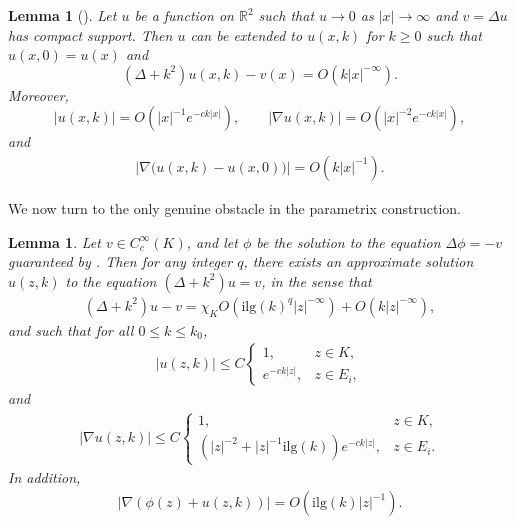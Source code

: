 \documentclass[12pt]{amsart}
\newtheorem{lemma}[theorem]{Lemma}
\begin{document}
\begin{lemma}[{\cite[Lemma~2.12]{HNS}}]\label{lemma_HNS_2.12}
Let $u$ be a function on $\mathbb{R}^2$ such that $u \to 0$ as $|x| \to \infty$ and $v = \Delta u$ has compact support. Then $u$ can be extended to $u(x,k)$ for $k \ge 0$ such that $u(x,0)=u(x)$ and 
\[
(\Delta+k^2)u(x,k) - v(x) = O(k |x|^{-\infty}).
\]
Moreover,
\[
|u(x,k)| = O(|x|^{-1} e^{-ck|x|}), 
\qquad 
|\nabla u(x,k)| = O(|x|^{-2} e^{-ck|x|}),
\]
and
\begin{align}\label{deri4}
|\nabla \big(u(x,k) - u(x,0)\big)| = O(k|x|^{-1}).
\end{align}
\end{lemma}

We now turn to the only genuine obstacle in the parametrix construction.

\begin{lemma}\label{keylemma_proof}
Let $v\in C_c^\infty(K)$, and let $\phi$ be the solution to the equation $\Delta \phi = -v$ guaranteed by \cite[Lemma~2.9]{HNS}. Then for any integer $q$, there exists an approximate solution $u(z,k)$ to the equation $(\Delta+k^2)u = v$, in the sense that
\begin{align}\label{eq_error_est}
    (\Delta+k^2)u - v = \chi_K  O(\textrm{ilg}(k)^q |z|^{-\infty}) + O(k |z|^{-\infty}),
\end{align}
and such that for all $0\le k \le k_0$,
\begin{align}\label{eq_u}
    |u(z,k)| \le C \begin{cases}
        1, &z\in K,\\
        e^{-ck|z|}, &z\in E_i,
    \end{cases}
\end{align}
and
\begin{align}\label{eq_du}
    |\nabla u(z,k)|\le C \begin{cases}
        1, &z\in K,\\
        \left(|z|^{-2} + |z|^{-1} \textrm{ilg}(k)\right) e^{-ck|z|}, &z\in E_i.
    \end{cases}
\end{align}
In addition, 
\begin{align}\label{deri3}
|\nabla \left(\phi(z)+u(z,k)\right)| = O(\textrm{ilg}(k)|z|^{-1}).    
\end{align}


\end{lemma}
\end{document}
